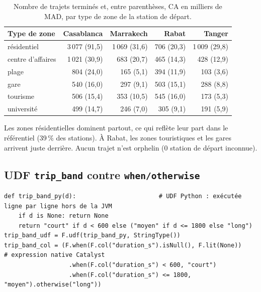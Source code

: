 \documentclass[10pt,a4paper]{article}
\begin{document}
\begin{table}[!htbp]
\centering\small
\begin{tabular}{@{}lrrrr@{}}
\toprule
\textbf{Type de zone} & \textbf{Casablanca} & \textbf{Marrakech} & \textbf{Rabat} & \textbf{Tanger} \\
\midrule
résidentiel        & 3\,077 \; (91,5) & 1\,069 \; (31,6) & 706 \; (20,3) & 1\,009 \; (29,8) \\
centre d'affaires  & 1\,021 \; (30,9) &    683 \; (20,7) & 465 \; (14,3) &    428 \; (12,9) \\
plage              &    804 \; (24,0) &    165 \; (5,1)  & 394 \; (11,9) &    103 \; (3,6) \\
gare               &    540 \; (16,0) &    297 \; (9,1)  & 503 \; (15,1) &    288 \; (8,8) \\
tourisme           &    506 \; (15,4) &    353 \; (10,5) & 545 \; (16,0) &    173 \; (5,3) \\
université         &    499 \; (14,7) &    246 \; (7,0)  & 305 \; (9,1)  &    191 \; (5,9) \\
\bottomrule
\end{tabular}
\caption{Nombre de trajets terminés et, entre parenthèses, CA en milliers de MAD, par type
de zone de la station de départ.}
\label{tab:zone}
\end{table}

Les zones résidentielles dominent partout, ce qui reflète leur part dans le référentiel
(39\,\% des stations). À Rabat, les zones touristiques et les gares arrivent juste derrière.
Aucun trajet n'est orphelin (0 station de départ inconnue).

\subsection{UDF \texttt{trip\_band} contre \texttt{when/otherwise}}

\begin{lstlisting}[style=py]
def trip_band_py(d):                       # UDF Python : exécutée ligne par ligne hors de la JVM
    if d is None: return None
    return "court" if d < 600 else ("moyen" if d <= 1800 else "long")
trip_band_udf = F.udf(trip_band_py, StringType())
trip_band_col = (F.when(F.col("duration_s").isNull(), F.lit(None))     # expression native Catalyst
                  .when(F.col("duration_s") < 600, "court")
                  .when(F.col("duration_s") <= 1800, "moyen").otherwise("long"))
\end{lstlisting}
\end{document}
